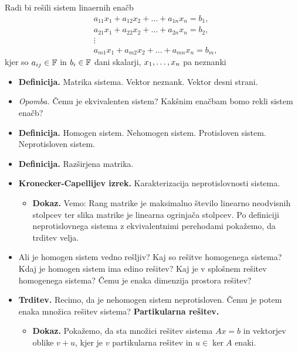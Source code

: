 \begin{enumerate}
    Radi bi rešili sistem linaernih enačb
    \begin{align*}
        &a_{11}x_1 + a_{12}x_2 + \ldots + a_{1n}x_n = b_1, \\
        &a_{21}x_1 + a_{22}x_2 + \ldots + a_{2n}x_n = b_2, \\
        &\vdots \\
        &a_{m1}x_1 + a_{m2}x_2 + \ldots + a_{mn}x_n = b_m,
    \end{align*}
    kjer so $a_{ij} \in \mathbb{F}$ in $b_i \in \mathbb{F}$ dani skalarji, $x_1, \ldots, x_{n}$ pa neznanki
    \begin{itemize}
        \item \colorbox{purple!30}{\textbf{Definicija.}} Matrika sistema. Vektor neznank. Vektor desni strani.
        \item \colorbox{yellow!30}{\emph{Opomba.}} Čemu je ekvivalenten sistem? Kakšnim enačbam bomo rekli sistem enačb?
        \item \colorbox{purple!30}{\textbf{Definicija.}} Homogen sistem. Nehomogen sistem. Protisloven sistem. Neprotisloven sistem.
        \item \colorbox{purple!30}{\textbf{Definicija.}} Razširjena matrika.
        \item \colorbox{blue!30}{\textbf{Kronecker-Capellijev izrek.}} Karakterizacija neprotislovnosti sistema. 
        \begin{itemize}
            \item \colorbox{green!30}{\textbf{Dokaz.}} Vemo: Rang matrike je maksimalno število linearno neodvisnih stolpcev ter slika matrike je linearna ogrinjača stolpcev. Po definiciji neprotislovnega sistema z ekvivalentnimi perehodami pokažemo, da trditev velja.
        \end{itemize}
        \item Ali je homogen sistem vedno rešljiv? Kaj so rešitve homogenega sistema? Kdaj je homogen sistem ima edino rešitev? Kaj je v splošnem rešitev homogenega sistema? Čemu je enaka dimenzija prostora rešitev?
        \item \colorbox{blue!30}{\textbf{Trditev.}} Recimo, da je nehomogen sistem neprotisloven. Čemu je potem enaka množica rešitev sistema? \textbf{Partikularna rešitev.}
        \begin{itemize}
            \item \colorbox{green!30}{\textbf{Dokaz.}} Pokažemo, da sta množici rešitev sistema $Ax = b$ in vektorjev oblike $v+u$, kjer je $v$ partikularna rešitev in $u \in \ker A$ enaki.
        \end{itemize}

\end{itemize}
\end{enumerate}
